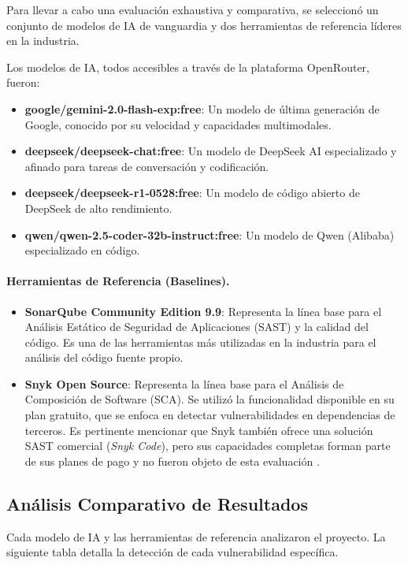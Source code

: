 Para llevar a cabo una evaluación exhaustiva y comparativa, se seleccionó un conjunto de modelos de IA de vanguardia y dos herramientas de referencia líderes en la industria.

Los modelos de IA, todos accesibles a través de la plataforma OpenRouter, fueron:
\begin{itemize}
    \item \textbf{google/gemini-2.0-flash-exp:free}: Un modelo de última generación de Google, conocido por su velocidad y capacidades multimodales.
    \item \textbf{deepseek/deepseek-chat:free}: Un modelo de DeepSeek AI especializado y afinado para tareas de conversación y codificación.
    \item \textbf{deepseek/deepseek-r1-0528:free}: Un modelo de código abierto de DeepSeek de alto rendimiento.
    \item \textbf{qwen/qwen-2.5-coder-32b-instruct:free}: Un modelo de Qwen (Alibaba) especializado en código.
\end{itemize}

\paragraph{Herramientas de Referencia (Baselines).}
\begin{itemize}
\item \textbf{SonarQube Community Edition 9.9}: Representa la línea base para el Análisis Estático de Seguridad de
Aplicaciones (SAST) y la calidad del código. Es una de las herramientas más utilizadas en la industria para el análisis del código fuente propio.
\item \textbf{Snyk Open Source}: Representa la línea base para el Análisis de Composición de Software (SCA). Se utilizó la funcionalidad disponible en su plan gratuito, que se enfoca en detectar vulnerabilidades en dependencias de terceros. Es pertinente mencionar que Snyk también ofrece una solución SAST comercial (\textit{Snyk Code}), pero sus capacidades completas forman parte de sus planes de pago y no fueron objeto de esta evaluación \cite{snyk_plans}.
\end{itemize}

\subsection{Análisis Comparativo de Resultados}
\label{subsec:analisis_comparativo_resultados}
Cada modelo de IA y las herramientas de referencia analizaron el proyecto. La siguiente tabla detalla la detección de cada vulnerabilidad específica.

